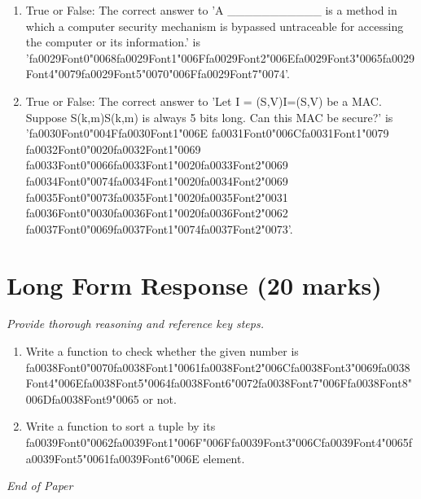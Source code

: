 \documentclass[12pt]{article}
\begin{document}
\begin{enumerate}[label=\arabic*.]
\item True or False: The correct answer to 'A \_\_\_\_\_\_\_\_\_\_\_ is a method in which a computer security mechanism is bypassed untraceable for accessing the computer or its information.' is '{\csname fa0029Font0\endcsname\char"0068}{\csname fa0029Font1\endcsname\char"006F}{\csname fa0029Font2\endcsname\char"006E}{\csname fa0029Font3\endcsname\char"0065}{\csname fa0029Font4\endcsname\char"0079}{\csname fa0029Font5\endcsname\char"0070}{\char"006F}{\csname fa0029Font7\endcsname\char"0074}'.
\item True or False: The correct answer to 'Let I = (S,V)I=(S,V) be a MAC. Suppose S(k,m)S(k,m) is always 5 bits long. Can this MAC be secure?' is '{\csname fa0030Font0\endcsname\char"004F}{\csname fa0030Font1\endcsname\char"006E} {\csname fa0031Font0\endcsname\char"006C}{\csname fa0031Font1\endcsname\char"0079} {\csname fa0032Font0\endcsname\char"0020}{\csname fa0032Font1\endcsname\char"0069} {\csname fa0033Font0\endcsname\char"0066}{\csname fa0033Font1\endcsname\char"0020}{\csname fa0033Font2\endcsname\char"0069} {\csname fa0034Font0\endcsname\char"0074}{\csname fa0034Font1\endcsname\char"0020}{\csname fa0034Font2\endcsname\char"0069} {\csname fa0035Font0\endcsname\char"0073}{\csname fa0035Font1\endcsname\char"0020}{\csname fa0035Font2\endcsname\char"0031} {\csname fa0036Font0\endcsname\char"0030}{\csname fa0036Font1\endcsname\char"0020}{\csname fa0036Font2\endcsname\char"0062} {\csname fa0037Font0\endcsname\char"0069}{\csname fa0037Font1\endcsname\char"0074}{\csname fa0037Font2\endcsname\char"0073}'.
\end{enumerate}

\section*{Long Form Response (20 marks)}
\textit{Provide thorough reasoning and reference key steps.}
\begin{enumerate}[label=\arabic*.]
\item Write a function to check whether the given number is {\csname fa0038Font0\endcsname\char"0070}{\csname fa0038Font1\endcsname\char"0061}{\csname fa0038Font2\endcsname\char"006C}{\csname fa0038Font3\endcsname\char"0069}{\csname fa0038Font4\endcsname\char"006E}{\csname fa0038Font5\endcsname\char"0064}{\csname fa0038Font6\endcsname\char"0072}{\csname fa0038Font7\endcsname\char"006F}{\csname fa0038Font8\endcsname\char"006D}{\csname fa0038Font9\endcsname\char"0065} or not.
\item Write a function to sort a tuple by its {\csname fa0039Font0\endcsname\char"0062}{\csname fa0039Font1\endcsname\char"006F}{\char"006F}{\csname fa0039Font3\endcsname\char"006C}{\csname fa0039Font4\endcsname\char"0065}{\csname fa0039Font5\endcsname\char"0061}{\csname fa0039Font6\endcsname\char"006E} element.
\end{enumerate}

\vfill
\noindent\textit{End of Paper}
\end{document}

